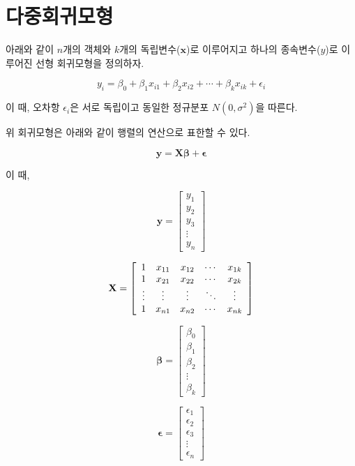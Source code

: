 \documentclass[]{book}
\begin{document}
\hypertarget{multiple-linear-regression}{%
\section{다중회귀모형}\label{multiple-linear-regression}}

아래와 같이 \(n\)개의 객체와 \(k\)개의 독립변수(\(\mathbf{x}\))로 이루어지고 하나의 종속변수(\(y\))로 이루어진 선형 회귀모형을 정의하자.

\begin{equation}
y_i = \beta_0 + \beta_1 x_{i1} + \beta_2 x_{i2} + \cdots + \beta_k x_{ik} + \epsilon_i
\label{eq:multiple-linear-regression}
\end{equation}

이 때, 오차항 \(\epsilon_i\)은 서로 독립이고 동일한 정규분포 \(N(0, \sigma^2)\)을 따른다.

위 회귀모형은 아래와 같이 행렬의 연산으로 표한할 수 있다.

\begin{equation}
\mathbf{y} = \mathbf{X} \boldsymbol{\beta} + \boldsymbol{\epsilon} \label{eq:multiple-linear-regression-matrix}
\end{equation}

이 때,

\[
\mathbf{y} = \left[ \begin{array}{c}
y_1 \\ y_2 \\ y_3 \\ \vdots \\ y_n
\end{array} \right]
\]

\[
\mathbf{X} = \left[ \begin{array}{c c c c c}
1 & x_{11} & x_{12} & \cdots & x_{1k}\\
1 & x_{21} & x_{22} & \cdots & x_{2k}\\
\vdots & \vdots & \vdots & \ddots & \vdots \\
1 & x_{n1} & x_{n2} & \cdots & x_{nk}
\end{array} \right]
\]

\[
\boldsymbol{\beta} = \left[ \begin{array}{c}
\beta_0 \\ \beta_1 \\ \beta_2 \\ \vdots \\ \beta_k
\end{array} \right]
\]

\[
\boldsymbol{\epsilon} = \left[ \begin{array}{c}
\epsilon_1 \\ \epsilon_2 \\ \epsilon_3 \\ \vdots \\ \epsilon_n
\end{array} \right]
\]
\end{document}
